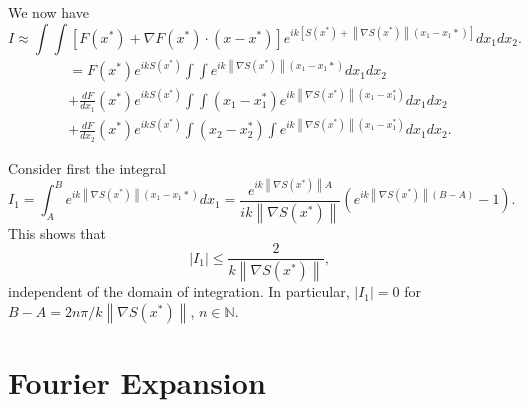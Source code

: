 \documentclass{article}
\newcommand{\norm}[1]{\left\lVert #1 \right\rVert}
\theoremstyle{plain}
\begin{document}
We now have
\begin{equation}
	I \approx \int\int \left[ F(x^*) + \nabla F(x^*) \cdot (x-x^*) \right] e^{ik\left[S(x^*) + \norm{\nabla S(x^*)}(x_1-x_1*) \right]} dx_1dx_2.
\end{equation}
\begin{multline}
	= F(x^*) e^{ikS(x^*)} \int\int e^{ik\norm{\nabla S(x^*)}(x_1-x_1*)} dx_1dx_2 \\
	+ \frac{dF}{dx_1}(x^*) e^{ikS(x^*)} \int\int (x_1-x_1^*) e^{ik\norm{\nabla S(x^*)}(x_1-x_1^*)} dx_1dx_2 \\
	+ \frac{dF}{dx_2}(x^*) e^{ikS(x^*)} \int (x_2-x_2^*) \int e^{ik\norm{\nabla S(x^*)}(x_1-x_1^*)} dx_1dx_2.
\end{multline}



Consider first the integral
\begin{equation}
	I_1 = \int_A^B e^{ik\norm{\nabla S(x^*)}(x_1-x_1*)} dx_1 = \frac{e^{ik\norm{\nabla S(x^*)}A}}{ik\norm{\nabla S(x^*)}} \left( e^{ik\norm{\nabla S(x^*)}(B-A)}-1 \right).
\end{equation}
This shows that
\begin{equation}
	|I_1| \leq \frac{2}{k\norm{\nabla S(x^*)}},
\end{equation}
independent of the domain of integration.
In particular, $|I_1| = 0$ for $B-A = 2n\pi / k\norm{\nabla S(x^*)}$, $n\in\mathbb{N}$.







\section{Fourier Expansion}\label{sec_fourier}
\end{document}
